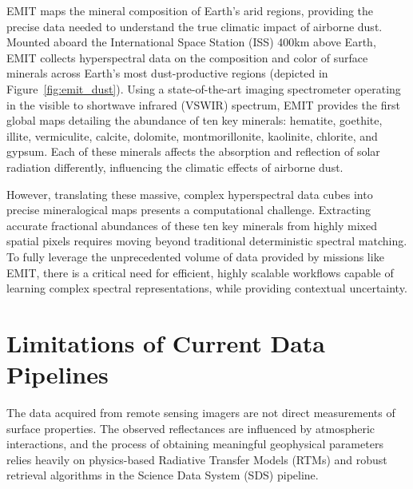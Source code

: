 \documentclass[11pt]{report}
\begin{document}
EMIT maps the mineral composition of Earth's arid regions, providing the precise data needed to understand the true climatic impact of airborne dust.
Mounted aboard the International Space Station (ISS) 400km above Earth, EMIT collects hyperspectral data on the composition and color of surface minerals across Earth’s most dust-productive regions (depicted in Figure~\ref{fig:emit_dust}). 
Using a state-of-the-art imaging spectrometer operating in the visible to shortwave infrared (VSWIR) spectrum, EMIT provides the first global maps detailing the abundance of ten key minerals: hematite, goethite, illite, vermiculite, calcite, dolomite, montmorillonite, kaolinite, chlorite, and gypsum. 
Each of these minerals affects the absorption and reflection of solar radiation differently, influencing the climatic effects of airborne dust.

However, translating these massive, complex hyperspectral data cubes into precise mineralogical maps presents a computational challenge. 
Extracting accurate fractional abundances of these ten key minerals from highly mixed spatial pixels requires moving beyond traditional deterministic spectral matching. 
To fully leverage the unprecedented volume of data provided by missions like EMIT, there is a critical need for efficient, highly scalable workflows capable of learning complex spectral representations, while providing contextual uncertainty.

\section{Limitations of Current Data Pipelines}
\label{sec:limitations_pipelines}

The data acquired from remote sensing imagers are not direct measurements of surface properties.
The observed reflectances are influenced by atmospheric interactions, and the process of obtaining meaningful geophysical parameters relies heavily on physics-based Radiative Transfer Models (RTMs) and robust retrieval algorithms in the Science Data System (SDS) pipeline.
\end{document}
